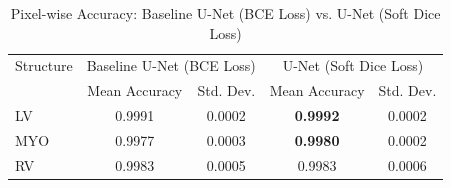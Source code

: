 \documentclass{article}
\begin{document}
\begin{table}[H]
  \centering
  \caption{Pixel-wise Accuracy: Baseline U-Net (BCE Loss) vs. U-Net (Soft Dice Loss)}
  \label{tab:soft_dice_unet_accuracy}
  \begin{tabular}{l|cc|cc}
    \toprule
    Structure & \multicolumn{2}{c|}{Baseline U-Net (BCE Loss)} & \multicolumn{2}{c}{U-Net (Soft Dice Loss)}                               \\
              & Mean Accuracy                                  & Std. Dev.                                  & Mean Accuracy   & Std. Dev. \\
    \midrule
    LV        & 0.9991                                         & 0.0002                                     & \textbf{0.9992} & 0.0002    \\
    MYO       & 0.9977                                         & 0.0003                                     & \textbf{0.9980} & 0.0002    \\
    RV        & 0.9983                                         & 0.0005                                     & 0.9983          & 0.0006    \\
    \bottomrule
  \end{tabular}
\end{table}
\end{document}
